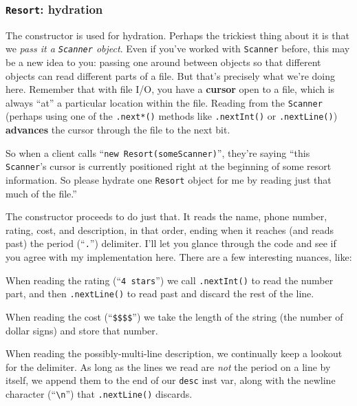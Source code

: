 \subsubsection{\texttt{Resort}: hydration}

The constructor is used for hydration. Perhaps the trickiest thing about it is
that we \textit{pass it a \texttt{Scanner} object}. Even if you've worked with
\texttt{Scanner} before, this may be a new idea to you: passing one around
between objects so that different objects can read different parts of a file.
But that's precisely what we're doing here. Remember that with file I/O, you
have a \textbf{cursor} open to a file, which is always ``at'' a particular
location within the file. Reading from the \texttt{Scanner} (perhaps using one
of the \texttt{.next*()} methods like \texttt{.nextInt()} or
\texttt{.nextLine()}) \textbf{advances} the cursor through the file to the
next bit.

So when a client calls ``\texttt{new Resort(someScanner)}'', they're saying
``this \texttt{Scanner}'s cursor is currently positioned right at the
beginning of some resort information. So please hydrate one \texttt{Resort}
object for me by reading just that much of the file.''

The constructor proceeds to do just that. It reads the name, phone number,
rating, cost, and description, in that order, ending when it reaches (and
reads past) the period (``\texttt{.}'') delimiter. I'll let you glance through
the code and see if you agree with my implementation here. There are a few
interesting nuances, like:

\begin{compactitem}

\item When reading the rating (``\texttt{4 stars}'') we call
\texttt{.nextInt()} to read the number part, and then \texttt{.nextLine()} to
read past and discard the rest of the line.

\item When reading the cost (``\texttt{\$\$\$\$}'') we take the length of the
string (the number of dollar signs) and store that number.

\item When reading the possibly-multi-line description, we continually keep a
lookout for the delimiter. As long as the lines we read are \textit{not} the
period on a line by itself, we append them to the end of our \texttt{desc}
inst var, along with the newline character (``\texttt{\textbackslash n}'') that
\texttt{.nextLine()} discards.

\end{compactitem}

